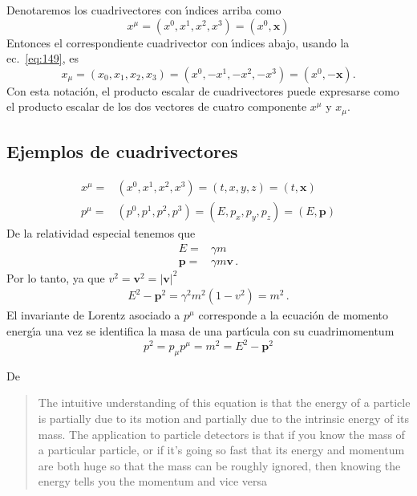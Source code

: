 \begin{frame}
Denotaremos los cuadrivectores con \'\i ndices arriba como
\begin{equation}
  \label{eq:upindx}
  x^\mu=(x^0,x^1,x^2,x^3)=(x^0,\mathbf{x})
\end{equation}
Entonces el correspondiente cuadrivector con \'\i ndices abajo, usando la ec.~\eqref{eq:149}, es
\begin{equation}
  x_\mu=(x_0,x_1,x_2,x_3)=(x^0,-x^1,-x^2,-x^3)=(x^0,-\mathbf{x}).
\end{equation}
Con esta notaci\'on, el producto escalar de cuadrivectores puede expresarse como el producto escalar de los dos vectores de cuatro componente $x^\mu$ y $x_\mu$.
\subsection{Ejemplos de cuadrivectores}
\begin{align}
    x^\mu=&(x^0,x^1,x^2,x^3)=(t,x,y,z)=(t,\mathbf{x})\\
  p^\mu=&(p^0,p^1,p^2,p^3)=(E,p_x,p_y,p_z)=(E,\mathbf{p})
\end{align}
De la relatividad especial tenemos que
\begin{align}
  E=&\gamma m \nonumber\\
  \mathbf{p}=&\gamma m\mathbf{v}\,.
\end{align}
Por lo tanto, ya que $v^2=\mathbf{v}^2=|\mathbf{v}|^2$
\begin{align}
  E^2-\mathbf{p}^2=\gamma^2m^2(1-v^2)=m^2\,.
\end{align}
El invariante de Lorentz asociado a $p^\mu$ corresponde a la ecuaci\'on de momento energ\'\i a una vez se identifica la masa de una part\'\i cula con su cuadrimomentum
\begin{equation}
  p^2=p_\mu p^\mu=m^2=E^2-\mathbf{p}^2
\end{equation}
\end{frame}
De \cite{uslhcblog}
\begin{quote}
  The intuitive understanding of this equation is that the energy of a particle is partially due to its motion and partially due to the intrinsic energy of its mass.  The application to particle detectors is that if you know the mass of a particular particle, or if it’s going so fast that its energy and momentum are both huge so that the mass can be roughly ignored, then knowing the energy tells you the momentum and vice versa
\end{quote}


